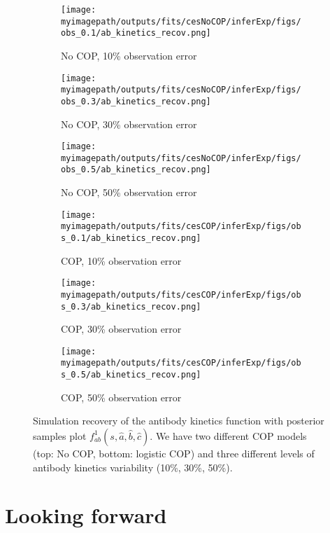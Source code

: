 \documentclass{article}
\newcommand{\myimagepath}{/Users/davidhodgson/Dropbox/Mac (3)/Documents/research/Rpackages/rjmc/}
\begin{document}
\begin{figure}[H]
\label{fit2:ab}
    \centering
    \begin{subfigure}{0.31\textwidth}
        \centering
        \texttt{[image: \\myimagepath/outputs/fits/cesNoCOP/inferExp/figs/obs\_0.1/ab\_kinetics\_recov.png]}
        \caption{No COP, 10\% observation error}
    \end{subfigure}
    \begin{subfigure}{0.31\textwidth}
        \centering
        \texttt{[image: \\myimagepath/outputs/fits/cesNoCOP/inferExp/figs/obs\_0.3/ab\_kinetics\_recov.png]}
        \caption{No COP, 30\% observation error}
    \end{subfigure}
    \begin{subfigure}{0.31\textwidth}
        \centering
        \texttt{[image: \\myimagepath/outputs/fits/cesNoCOP/inferExp/figs/obs\_0.5/ab\_kinetics\_recov.png]}
        \caption{No COP, 50\% observation error}
    \end{subfigure}
    
  \begin{subfigure}{0.31\textwidth}
        \centering
        \texttt{[image: \\myimagepath/outputs/fits/cesCOP/inferExp/figs/obs\_0.1/ab\_kinetics\_recov.png]}
        \caption{ COP, 10\% observation error}
    \end{subfigure}
    \begin{subfigure}{0.31\textwidth}
        \centering
        \texttt{[image: \\myimagepath/outputs/fits/cesCOP/inferExp/figs/obs\_0.3/ab\_kinetics\_recov.png]}
        \caption{ COP, 30\% observation error}
    \end{subfigure}
    \begin{subfigure}{0.31\textwidth}
        \centering
        \texttt{[image: \\myimagepath/outputs/fits/cesCOP/inferExp/figs/obs\_0.5/ab\_kinetics\_recov.png]}
        \caption{ COP, 50\% observation error}
    \end{subfigure}
    
    \caption{Simulation recovery of the antibody kinetics function with posterior samples plot $f^1_{ab}(s, \hat{a}, \hat{b}, \hat{c})$. We have two different COP models (top: No COP, bottom: logistic COP) and three different levels of antibody kinetics variability (10\%, 30\%, 50\%).}
   \end{figure}




\newpage
\section{Looking forward}
\end{document}
